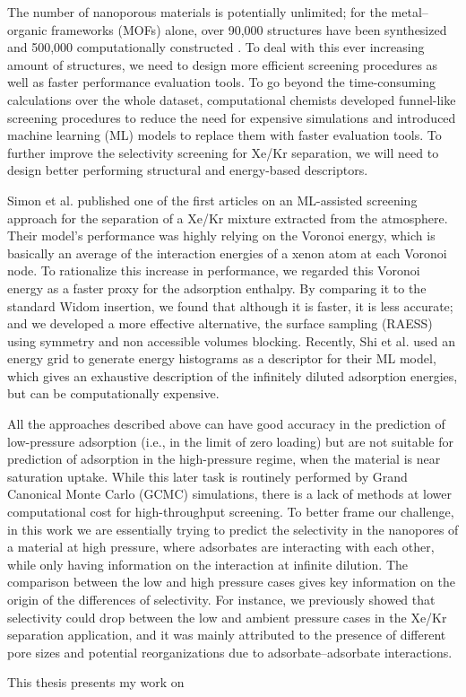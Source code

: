 The number of nanoporous materials is potentially unlimited; for the metal--organic frameworks (MOFs) alone, over 90,000 structures have been synthesized \cite{Groom_2016} and 500,000 computationally constructed \cite{Wilmer_2012,Boyd_2016,Colon_2017}. To deal with this ever increasing amount of structures, we need to design more efficient screening procedures as well as faster performance evaluation tools. To go beyond the time-consuming calculations over the whole dataset, computational chemists developed funnel-like screening procedures to reduce the need for expensive simulations and introduced machine learning (ML) models to replace them with faster evaluation tools.\cite{Ren_2022} To further improve the selectivity screening for Xe/Kr separation, we will need to design better performing structural and energy-based descriptors.

Simon et al. published one of the first articles on an ML-assisted screening approach for the separation of a Xe/Kr mixture extracted from the atmosphere.\cite{Simon_2015} Their model's performance was highly relying on the Voronoi energy, which is basically an average of the interaction energies of a xenon atom at each Voronoi node.\cite{Rycroft_2009} To rationalize this increase in performance, we regarded this Voronoi energy as a faster proxy for the adsorption enthalpy. By comparing it to the standard Widom insertion, we found that although it is faster, it is less accurate; and we developed a more effective alternative, the surface sampling (RAESS) using symmetry and non accessible volumes blocking.\cite{Ren_2023} Recently, Shi et al. used an energy grid to generate energy histograms as a descriptor for their ML model, which gives an exhaustive description of the infinitely diluted adsorption energies,\cite{Shi_2023} but can be computationally expensive.

All the approaches described above can have good accuracy in the prediction of low-pressure adsorption (i.e., in the limit of zero loading) but are not suitable for prediction of adsorption in the high-pressure regime, when the material is near saturation uptake. While this later task is routinely performed by Grand Canonical Monte Carlo (GCMC) simulations, there is a lack of methods at lower computational cost for high-throughput screening. To better frame our challenge, in this work we are essentially trying to predict the selectivity in the nanopores of a material at high pressure, where adsorbates are interacting with each other, while only having information on the interaction at infinite dilution. The comparison between the low and high pressure cases gives key information on the origin of the differences of selectivity. For instance, we previously showed that selectivity could drop between the low and ambient pressure cases in the Xe/Kr separation application, and it was mainly attributed to the presence of different pore sizes and potential reorganizations due to adsorbate--adsorbate interactions.\cite{Ren_2021}


\begin{center}
\end{center}

This thesis presents my work on 




\vfill
\begin{center}
\end{center}
\vfill\vfill

